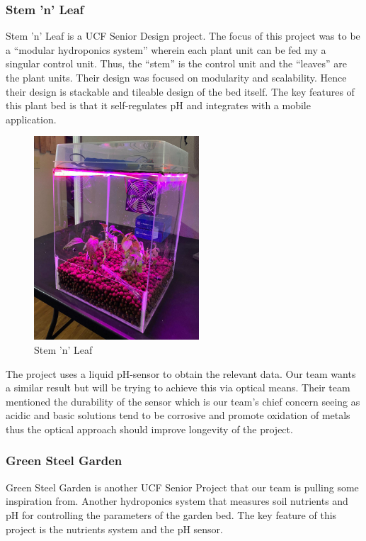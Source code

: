 \subsubsection{Stem 'n' Leaf}
Stem 'n' Leaf is a UCF Senior Design project. The focus of this project was to be a ``modular hydroponics system'' wherein each plant unit can be fed my a singular control unit. Thus, the ``stem'' is the control unit and the ``leaves'' are the plant units\cite{stem-n-leaf}. Their design was focused on modularity and scalability. Hence their design is stackable and tileable design of the bed itself. The key features of this plant bed is that it self-regulates pH and integrates with a mobile application.
\begin{figure}[H]
    \caption{Stem 'n' Leaf}
    \centering
    \includegraphics[width=.5\textwidth]{images/3-1-5Pic.png}
\end{figure}

The project uses a liquid pH-sensor to obtain the relevant data. Our team wants a similar result but will be trying to achieve this via optical means. Their team mentioned the durability of the sensor which is our team's chief concern seeing as acidic and basic solutions tend to be corrosive and promote oxidation of metals thus the optical approach should improve longevity of the project. 

\subsubsection{Green Steel Garden}
Green Steel Garden is another UCF Senior Project that our team is pulling some inspiration from. Another hydroponics system that measures soil nutrients and pH for controlling the parameters of the garden bed\cite{green-steel}. The key feature of this project is the nutrients system and the pH sensor.

